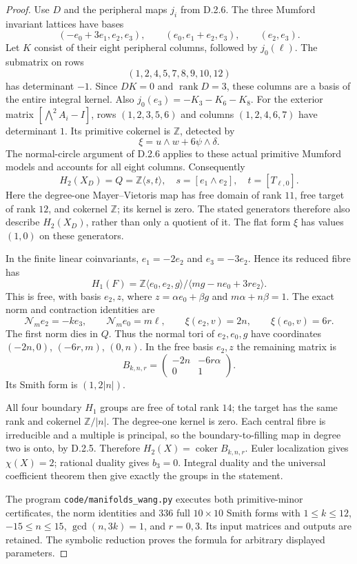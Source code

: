 \begin{proof}
Use $D$ and the peripheral maps $j_i$ from D.2.6. The three
Mumford invariant lattices have bases
\[
 (-e_0+3e_1,e_2,e_3),\qquad
 (e_0,e_1+e_2,e_3),\qquad(e_2,e_3).
\]
Let $K$ consist of their eight peripheral columns, followed by
$j_0(\ell)$. The submatrix on rows
\[
 (1,2,4,5,7,8,9,10,12)
\]
has determinant $-1$. Since $DK=0$ and $\operatorname{rank}D=3$, these columns
are a basis of the entire integral kernel. Also
$j_0(e_3)=-K_3-K_6-K_8$.
For the exterior matrix $[\bigwedge^2 A_i-I]$, rows
$(1,2,3,5,6)$ and columns $(1,2,4,6,7)$ have determinant $1$.
Its primitive cokernel is $\mathbb Z$, detected by
\[
 \xi=u\wedge w+6\psi\wedge\delta.
\]
The normal-circle argument of D.2.6 applies to these actual
primitive Mumford models and accounts for all eight columns.
Consequently
\[
 H_2(X_D)=Q=\mathbb Z\langle s,t\rangle,
 \quad s=[e_1\wedge e_2],\quad t=[T_{\ell,0}].
\]
Here the degree-one Mayer--Vietoris map has free domain of rank
$11$, free target of rank $12$, and cokernel $\mathbb Z$;
its kernel is zero. The stated generators therefore also
describe $H_2(X_D)$, rather than only a quotient of it.
The flat form $\xi$ has values $(1,0)$ on these generators.

In the finite linear coinvariants,
$e_1=-2e_2$ and $e_3=-3e_2$. Hence its reduced fibre has
\[
 H_1(F)=
 \mathbb Z\langle e_0,e_2,g\rangle/
 \langle mg-ne_0+3r e_2\rangle.
\]
This is free, with basis $e_2,z$, where
$z=\alpha e_0+\beta g$ and $m\alpha+n\beta=1$.
The exact norm and contraction identities are
\[
 \mathcal N_m e_2=-k e_3,\qquad
 \mathcal N_m e_0=m\ell,\qquad
 \xi(e_2,v)=2n,\qquad \xi(e_0,v)=6r.
\]
The first norm dies in $Q$. Thus the normal tori of
$e_2,e_0,g$ have coordinates $(-2n,0)$, $(-6r,m)$,
$(0,n)$. In the free basis $e_2,z$ the remaining matrix is
\[
 B_{k,n,r}=\begin{pmatrix}-2n&-6r\alpha\\0&1\end{pmatrix}.
\]
Its Smith form is $(1,2|n|)$.

All four boundary $H_1$ groups are free of total rank $14$;
the target has the same rank and cokernel $\mathbb Z/|n|$.
The degree-one kernel is zero. Each central fibre is irreducible
and a multiple is principal, so the boundary-to-filling map
in degree two is onto, by D.2.5. Therefore
$H_2(X)=\operatorname{coker}B_{k,n,r}$.
Euler localization gives $\chi(X)=2$; rational duality gives
$b_3=0$. Integral duality and the universal coefficient theorem
then give exactly the groups in the statement.

The program \texttt{code/manifolds\_wang.py} executes both
primitive-minor certificates, the norm identities and 336 full
$10\times10$ Smith forms with $1\leq k\leq12$,
$-15\leq n\leq15$, $\gcd(n,3k)=1$, and $r=0,3$.
Its input matrices and outputs are retained. The symbolic
reduction proves the formula for arbitrary displayed parameters.
\end{proof}

